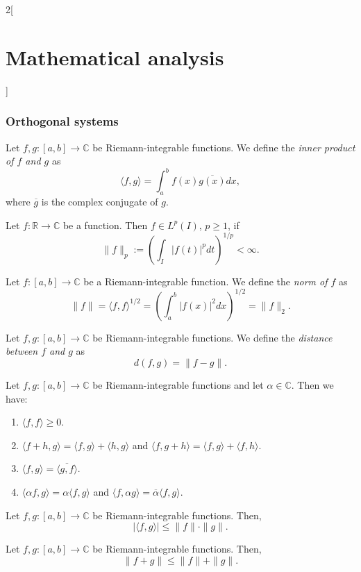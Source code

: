 \documentclass[class=article,crop=false]{standalone}
\begin{document}
\begin{multicols}{2}[\section{Mathematical analysis}]
\subsubsection*{Orthogonal systems}
\begin{definition}
Let $f,g:[a,b]\rightarrow\mathbb{C}$ be Riemann-integrable functions. We define the \textit{inner product of $f$ and $g$} as $$\langle f,g\rangle=\int_a^bf(x)\overline{g(x)}dx,$$ where $\overline{g}$ is the complex conjugate of $g$.
\end{definition}
\begin{definition}
Let $f:\mathbb{R}\rightarrow\mathbb{C}$ be a function. Then $f\in L^p(I)$, $p\geq1$, if $$\|f\|_p:=\left(\int_I|f(t)|^pdt\right)^{1/p}<\infty.$$ 
\end{definition}
\begin{definition}
Let $f:[a,b]\rightarrow\mathbb{C}$ be a Riemann-integrable function. We define the \textit{norm of $f$} as $$\|f\|=\langle f,f\rangle^{1/2}=\left(\int_a^b|f(x)|^2dx\right)^{1/2}=\|f\|_2.$$
\end{definition}
\begin{definition}
Let $f,g:[a,b]\rightarrow\mathbb{C}$ be Riemann-integrable functions. We define the \textit{distance between $f$ and $g$} as $$d(f,g)=\|f-g\|.$$
\end{definition}
\begin{prop}
Let $f,g:[a,b]\rightarrow\mathbb{C}$ be Riemann-integrable functions and let $\alpha\in\mathbb{C}$. Then we have:
\begin{enumerate}
    \item $\langle f,f\rangle\geq 0$.
    \item $\langle f+h,g\rangle=\langle f,g\rangle+\langle h,g\rangle$ and $\langle f,g+h\rangle=\langle f,g\rangle+\langle f,h\rangle$.
    \item $\langle f,g\rangle=\overline{\langle g,f\rangle}$.
    \item $\langle \alpha f,g\rangle=\alpha\langle f,g\rangle$ and $\langle f,\alpha g\rangle=\overline{\alpha}\langle f,g\rangle$.
\end{enumerate}
\end{prop}
\begin{theorem}
Let $f,g:[a,b]\rightarrow\mathbb{C}$ be Riemann-integrable functions. Then, $$|\langle f,g\rangle|\leq\|f\|\cdot\|g\|.$$
\end{theorem}
\begin{theorem}
Let $f,g:[a,b]\rightarrow\mathbb{C}$ be Riemann-integrable functions. Then, $$\| f+g\|\leq\|f\|+\|g\|.$$

\end{theorem}
\end{multicols}
\end{document}
